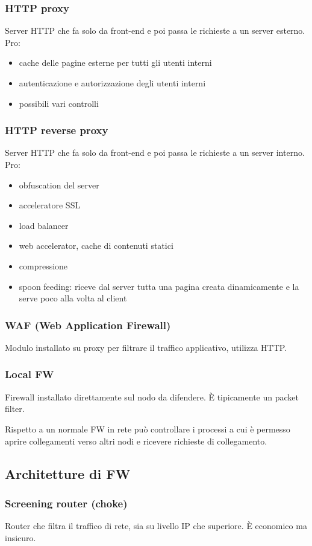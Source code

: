\documentclass[11pt]{article}
\begin{document}
\subsubsection{HTTP proxy}
Server HTTP che fa solo da front-end e poi passa le richieste a un server esterno.
Pro:
\begin{itemize}
    \item cache delle pagine esterne per tutti gli utenti interni 
    \item autenticazione e autorizzazione degli utenti interni 
    \item possibili vari controlli 
\end{itemize}
\subsubsection{HTTP reverse proxy}
Server HTTP che fa solo da front-end e poi passa le richieste a un server interno.
Pro:
\begin{itemize}
    \item obfuscation del server 
    \item acceleratore SSL 
    \item load balancer 
    \item web accelerator, cache di contenuti statici 
    \item compressione 
    \item spoon feeding: riceve dal server tutta una pagina creata dinamicamente e la serve poco alla volta al client 
\end{itemize}
\subsubsection{WAF (Web Application Firewall)}
Modulo installato su proxy per filtrare il traffico applicativo, utilizza HTTP.
\subsubsection{Local FW}
Firewall installato direttamente sul nodo da difendere. È tipicamente un packet filter.

Rispetto a un normale FW in rete può controllare i processi a cui è permesso aprire collegamenti verso altri nodi e ricevere 
richieste di collegamento.
\subsection{Architetture di FW}
\subsubsection{Screening router (choke)}
Router che filtra il traffico di rete, sia su livello IP che superiore. È economico ma insicuro. 
\end{document}
